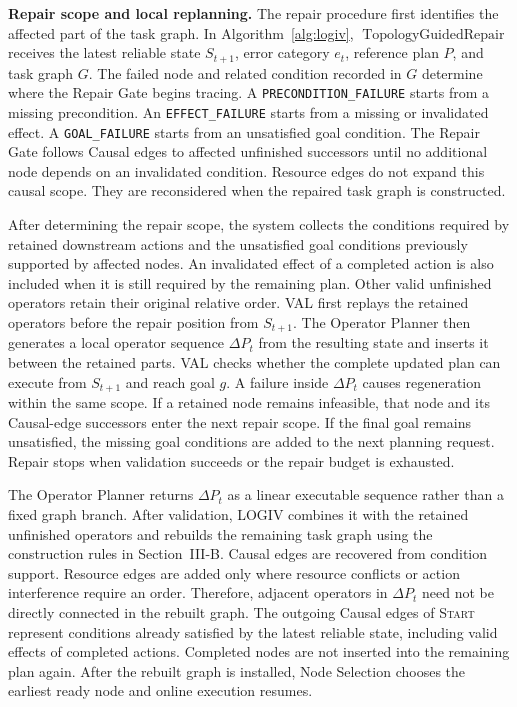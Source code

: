 \documentclass[letterpaper,10pt,conference]{ieeeconf}
\newcommand{\method}{LOGIV\xspace}
\begin{document}
\textbf{Repair scope and local replanning.}
The repair procedure first identifies the affected part of the task graph. In Algorithm~\ref{alg:logiv}, $\operatorname{TopologyGuidedRepair}$ receives the latest reliable state $S_{t+1}$, error category $e_t$, reference plan $P$, and task graph $G$. The failed node and related condition recorded in $G$ determine where the Repair Gate begins tracing. A \texttt{PRECONDITION\_FAILURE} starts from a missing precondition. An \texttt{EFFECT\_FAILURE} starts from a missing or invalidated effect. A \texttt{GOAL\_FAILURE} starts from an unsatisfied goal condition. The Repair Gate follows Causal edges to affected unfinished successors until no additional node depends on an invalidated condition. Resource edges do not expand this causal scope. They are reconsidered when the repaired task graph is constructed.

After determining the repair scope, the system collects the conditions required by retained downstream actions and the unsatisfied goal conditions previously supported by affected nodes. An invalidated effect of a completed action is also included when it is still required by the remaining plan. Other valid unfinished operators retain their original relative order. VAL first replays the retained operators before the repair position from $S_{t+1}$. The Operator Planner then generates a local operator sequence $\Delta P_t$ from the resulting state and inserts it between the retained parts. VAL checks whether the complete updated plan can execute from $S_{t+1}$ and reach goal $g$. A failure inside $\Delta P_t$ causes regeneration within the same scope. If a retained node remains infeasible, that node and its Causal-edge successors enter the next repair scope. If the final goal remains unsatisfied, the missing goal conditions are added to the next planning request. Repair stops when validation succeeds or the repair budget is exhausted.

The Operator Planner returns $\Delta P_t$ as a linear executable sequence rather than a fixed graph branch. After validation, \method combines it with the retained unfinished operators and rebuilds the remaining task graph using the construction rules in Section~III-B. Causal edges are recovered from condition support. Resource edges are added only where resource conflicts or action interference require an order. Therefore, adjacent operators in $\Delta P_t$ need not be directly connected in the rebuilt graph. The outgoing Causal edges of \textsc{Start} represent conditions already satisfied by the latest reliable state, including valid effects of completed actions. Completed nodes are not inserted into the remaining plan again. After the rebuilt graph is installed, Node Selection chooses the earliest ready node and online execution resumes.
\end{document}
